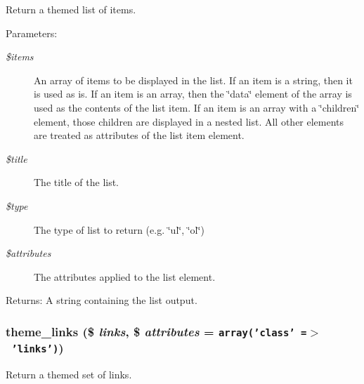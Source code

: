 Return a themed list of items.

\begin{Desc}
\item[Parameters:]
\begin{description}
\item[{\em \$items}]An array of items to be displayed in the list. If an item is a string, then it is used as is. If an item is an array, then the \char`\"{}data\char`\"{} element of the array is used as the contents of the list item. If an item is an array with a \char`\"{}children\char`\"{} element, those children are displayed in a nested list. All other elements are treated as attributes of the list item element. \item[{\em \$title}]The title of the list. \item[{\em \$type}]The type of list to return (e.g. \char`\"{}ul\char`\"{}, \char`\"{}ol\char`\"{}) \item[{\em \$attributes}]The attributes applied to the list element. \end{description}
\end{Desc}
\begin{Desc}
\item[Returns:]A string containing the list output. \end{Desc}
\hypertarget{group__themeable_g6a23e012993ee8a2494249148d15d2bf}{
\subsubsection[{theme\_\-links}]{\setlength{\rightskip}{0pt plus 5cm}theme\_\-links (\$ {\em links}, \/  \$ {\em attributes} = {\tt array('class'~=$>$~'links')})}}
\label{group__themeable_g6a23e012993ee8a2494249148d15d2bf}


Return a themed set of links.


